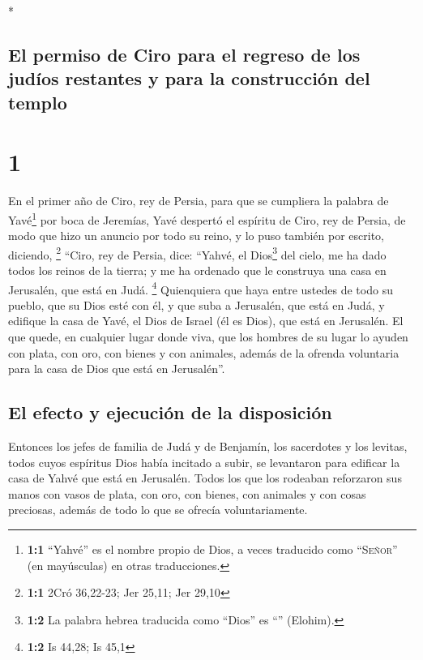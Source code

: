 \begin{paracol}{2} \switchcolumn[0]*

\hypertarget{el-permiso-de-ciro-para-el-regreso-de-los-juduxedos-restantes-y-para-la-construcciuxf3n-del-templo}{%
\subsection{El permiso de Ciro para el regreso de los judíos restantes y
para la construcción del
templo}\label{el-permiso-de-ciro-para-el-regreso-de-los-juduxedos-restantes-y-para-la-construcciuxf3n-del-templo}}

\hypertarget{section}{%
\section{1}\label{section}}

 En el primer año de Ciro, rey de Persia, para que se
cumpliera la palabra de Yavé\footnote{\textbf{1:1} ``Yahvé'' es el
  nombre propio de Dios, a veces traducido como ``\textsc{Señor}'' (en
  mayúsculas) en otras traducciones.} por boca de Jeremías, Yavé
despertó el espíritu de Ciro, rey de Persia, de modo que hizo un anuncio
por todo su reino, y lo puso también por escrito, diciendo, \footnote{\textbf{1:1}
  2Cró 36,22-23; Jer 25,11; Jer 29,10}  ``Ciro, rey de
Persia, dice: ``Yahvé, el Dios\footnote{\textbf{1:2} La palabra hebrea
  traducida como ``Dios'' es ``'' (Elohim).} del cielo, me
ha dado todos los reinos de la tierra; y me ha ordenado que le construya
una casa en Jerusalén, que está en Judá. \footnote{\textbf{1:2} Is
  44,28; Is 45,1}  Quienquiera que haya entre ustedes de
todo su pueblo, que su Dios esté con él, y que suba a Jerusalén, que
está en Judá, y edifique la casa de Yavé, el Dios de Israel (él es
Dios), que está en Jerusalén.  El que quede, en cualquier
lugar donde viva, que los hombres de su lugar lo ayuden con plata, con
oro, con bienes y con animales, además de la ofrenda voluntaria para la
casa de Dios que está en Jerusalén''.

\hypertarget{el-efecto-y-ejecuciuxf3n-de-la-disposiciuxf3n}{%
\subsection{El efecto y ejecución de la
disposición}\label{el-efecto-y-ejecuciuxf3n-de-la-disposiciuxf3n}}

 Entonces los jefes de familia de Judá y de Benjamín, los
sacerdotes y los levitas, todos cuyos espíritus Dios había incitado a
subir, se levantaron para edificar la casa de Yahvé que está en
Jerusalén.  Todos los que los rodeaban reforzaron sus
manos con vasos de plata, con oro, con bienes, con animales y con cosas
preciosas, además de todo lo que se ofrecía voluntariamente.


\end{paracol}
